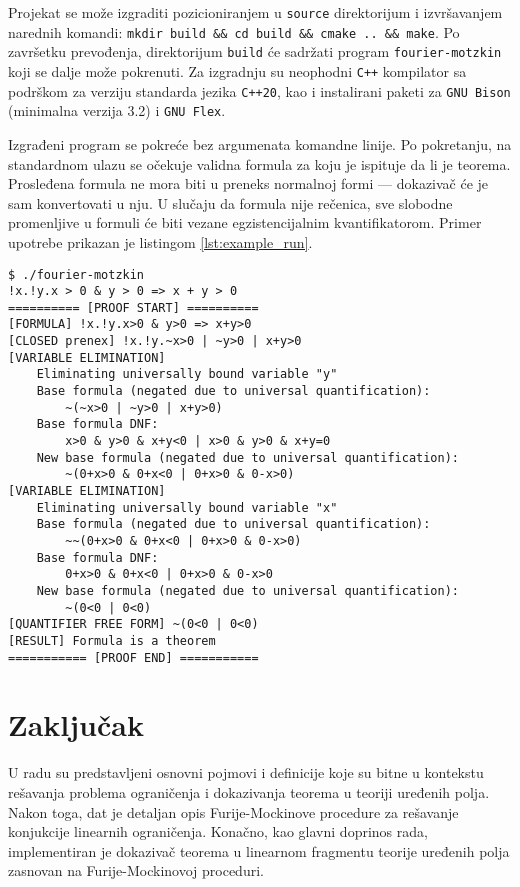 \documentclass[a4paper,10pt]{article}
\begin{document}
Projekat se može izgraditi pozicioniranjem u \texttt{source} direktorijum i izvršavanjem narednih komandi: \texttt{mkdir build \&\& cd build \&\& cmake .. \&\& make}. Po završetku prevođenja, direktorijum \texttt{build} će sadržati program \texttt{fourier-motzkin} koji se dalje može pokrenuti. Za izgradnju su neophodni \texttt{C++} kompilator sa podrškom za verziju standarda jezika \texttt{C++20}, kao i instalirani paketi za \texttt{GNU Bison} (minimalna verzija 3.2) i \texttt{GNU Flex}.

Izgrađeni program se pokreće bez argumenata komandne linije. Po pokretanju, na standardnom ulazu se očekuje validna formula za koju je ispituje da li je teorema. Prosleđena formula ne mora biti u preneks normalnoj formi --- dokazivač će je sam konvertovati u nju. U slučaju da formula nije rečenica, sve slobodne promenljive u formuli će biti vezane egzistencijalnim kvantifikatorom. Primer upotrebe prikazan je listingom \ref{lst:example_run}.


\begin{lstlisting}[basicstyle=\ttfamily\small,captionpos=b,caption={Primer pokretanja \texttt{fourier-motzkin} programa}, label=lst:example_run]
$ ./fourier-motzkin
!x.!y.x > 0 & y > 0 => x + y > 0
========== [PROOF START] ==========
[FORMULA] !x.!y.x>0 & y>0 => x+y>0
[CLOSED prenex] !x.!y.~x>0 | ~y>0 | x+y>0
[VARIABLE ELIMINATION]
    Eliminating universally bound variable "y"
    Base formula (negated due to universal quantification):
        ~(~x>0 | ~y>0 | x+y>0)
    Base formula DNF:
        x>0 & y>0 & x+y<0 | x>0 & y>0 & x+y=0
    New base formula (negated due to universal quantification):
        ~(0+x>0 & 0+x<0 | 0+x>0 & 0-x>0)
[VARIABLE ELIMINATION]
    Eliminating universally bound variable "x"
    Base formula (negated due to universal quantification):
        ~~(0+x>0 & 0+x<0 | 0+x>0 & 0-x>0)
    Base formula DNF:
        0+x>0 & 0+x<0 | 0+x>0 & 0-x>0
    New base formula (negated due to universal quantification):
        ~(0<0 | 0<0)
[QUANTIFIER FREE FORM] ~(0<0 | 0<0)
[RESULT] Formula is a theorem
=========== [PROOF END] ===========
\end{lstlisting}

\section{Zaključak}
\label{sec:zakljucak}

U radu su predstavljeni osnovni pojmovi i definicije koje su bitne u kontekstu rešavanja problema ograničenja i dokazivanja teorema u teoriji uređenih polja. Nakon toga, dat je detaljan opis Furije-Mockinove procedure za rešavanje konjukcije linearnih ograničenja. Konačno, kao glavni doprinos rada, implementiran je dokazivač teorema u linearnom fragmentu teorije uređenih polja zasnovan na Furije-Mockinovoj proceduri.
\end{document}
